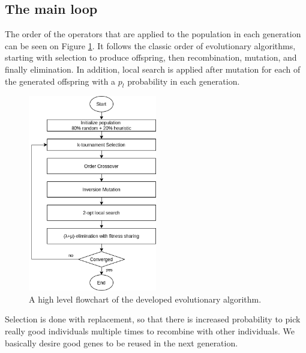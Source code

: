 \documentclass[a4paper,10pt]{article}
\newcommand{\ReplaceMe}[1]{{\color{blue}#1}}
\begin{document}
\subsection{The main loop} \label{ss:main_loop}


The order of the operators that are applied to the population in each generation can be seen on Figure \ref{fig:main_loop}. It follows the classic order of evolutionary algorithms, starting with selection to produce offspring, then recombination, mutation, and finally elimination. In addition, local search is applied after mutation for each of the generated offspring with a $p_l$ probability in each generation.

\begin{figure}[H]
\centering
\includegraphics[width=0.5\textwidth]{images/genetic_algorthm_main_loop.png}
\caption{A high level flowchart of the developed evolutionary algorithm.}
\label{fig:main_loop}
\end{figure}

Selection is done with replacement, so that there is increased probability to pick really good individuals multiple times to recombine with other individuals. We basically desire good genes to be reused in the next generation.
\end{document}
